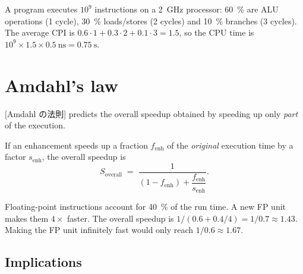 \documentclass[../main.tex]{subfiles}
\begin{document}
\begin{example}
  A program executes $10^{9}$ instructions on a \SI{2}{\giga\hertz}
  processor: \SI{60}{\percent} are ALU operations (1 cycle),
  \SI{30}{\percent} loads/stores (2 cycles) and \SI{10}{\percent} branches
  (3 cycles).  The average CPI is
  $0.6\cdot 1 + 0.3\cdot 2 + 0.1\cdot 3 = 1.5$, so the CPU time is
  $10^{9}\times 1.5 \times \SI{0.5}{\nano\second} = \SI{0.75}{\second}$.
\end{example}

\section{Amdahl's law}

[Amdahl の法則] predicts the overall speedup
obtained by speeding up only \emph{part} of the execution.

\begin{definition}
  If an enhancement speeds up a fraction $f_{\mathrm{enh}}$ of the
  \emph{original} execution time by a factor $s_{\mathrm{enh}}$, the overall
  speedup is
  \begin{equation}
    S_{\mathrm{overall}} \;=\;
    \frac{1}{(1 - f_{\mathrm{enh}}) + \dfrac{f_{\mathrm{enh}}}{s_{\mathrm{enh}}}} .
    \label{eq:amdahl}
  \end{equation}
\end{definition}


\begin{example}
  Floating-point instructions account for \SI{40}{\percent} of the run
  time.  A new FP unit makes them $4\times$ faster.  The overall speedup is
  $1/(0.6 + 0.4/4) = 1/0.7 \approx 1.43$.  Making the FP unit infinitely
  fast would only reach $1/0.6 \approx 1.67$.
\end{example}

\subsection{Implications}
\end{document}
